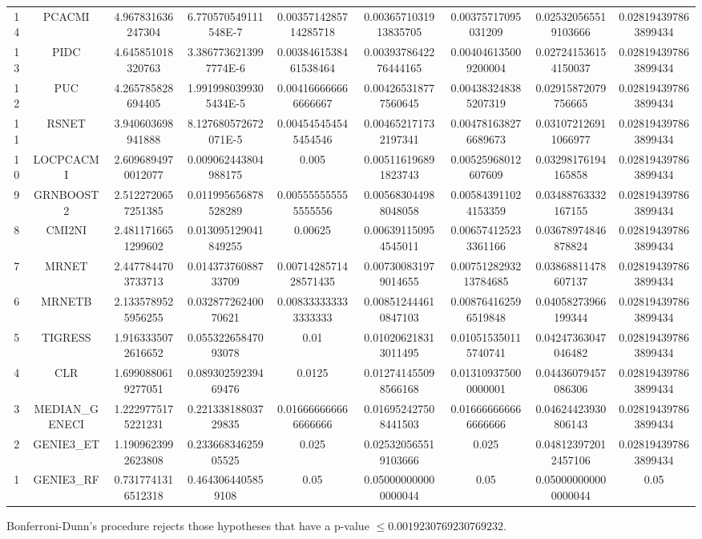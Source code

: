 \documentclass[a4paper,10pt]{article}
\begin{document}
\begin{landscape}
\begin{table}[!htp]
\begin{tabular}{ccccccccc}
14&PCACMI&4.967831636247304&6.770570549111548E-7&0.0035714285714285718&0.0036571031913835705&0.00375717095031209&0.025320565519103666&0.028194397863899434\\
13&PIDC&4.645851018320763&3.3867736213997774E-6&0.0038461538461538464&0.0039378642276444165&0.004046135009200004&0.027241536154150037&0.028194397863899434\\
12&PUC&4.265785828694405&1.9919980399305434E-5&0.004166666666666667&0.004265318777560645&0.004383248385207319&0.02915872079756665&0.028194397863899434\\
11&RSNET&3.940603698941888&8.127680572672071E-5&0.004545454545454546&0.004652171732197341&0.004781638276689673&0.031072126911066977&0.028194397863899434\\
10&LOCPCACMI&2.6096894970012077&0.009062443804988175&0.005&0.005116196891823743&0.00525968012607609&0.03298176194165858&0.028194397863899434\\
9&GRNBOOST2&2.5122720657251385&0.011995656878528289&0.005555555555555556&0.005683044988048058&0.005843911024153359&0.03488763332167155&0.028194397863899434\\
8&CMI2NI&2.4811716651299602&0.013095129041849255&0.00625&0.006391150954545011&0.006574125233361166&0.03678974846878824&0.028194397863899434\\
7&MRNET&2.4477844703733713&0.01437376088733709&0.0071428571428571435&0.007300831979014655&0.0075128293213784685&0.03868811478607137&0.028194397863899434\\
6&MRNETB&2.1335789525956255&0.03287726240070621&0.008333333333333333&0.008512444610847103&0.008764162596519848&0.04058273966199344&0.028194397863899434\\
5&TIGRESS&1.9163335072616652&0.05532265847093078&0.01&0.010206218313011495&0.010515350115740741&0.04247363047046482&0.028194397863899434\\
4&CLR&1.6990880619277051&0.08930259239469476&0.0125&0.012741455098566168&0.013109375000000001&0.04436079457086306&0.028194397863899434\\
3&MEDIAN_GENECI&1.2229775175221231&0.22133818803729835&0.016666666666666666&0.016952427508441503&0.016666666666666666&0.04624423930806143&0.028194397863899434\\
2&GENIE3_ET&1.1909623992623808&0.23366834625905525&0.025&0.025320565519103666&0.025&0.048123972012457106&0.028194397863899434\\
1&GENIE3_RF&0.7317741316512318&0.4643064405859108&0.05&0.050000000000000044&0.05&0.050000000000000044&0.05\\
\hline
\end{tabular}
\end{table}
Bonferroni-Dunn's procedure rejects those hypotheses that have a p-value $\le0.0019230769230769232$.



\end{landscape}
\end{document}
